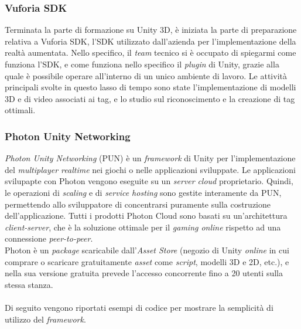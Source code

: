 \subsubsection{Vuforia SDK}
Terminata la parte di formazione su Unity 3D, \`e iniziata la parte di preparazione relativa a Vuforia SDK, l'SDK utilizzato dall'azienda per l'implementazione della realt\`a aumentata. Nello specifico, il \textit{team} tecnico si \`e occupato di spiegarmi come funziona l'SDK, e come funziona nello specifico il \textit{plugin} di Unity, grazie alla quale è possibile operare all’interno di un unico ambiente di lavoro. Le attivit\`a principali svolte in questo lasso di tempo sono state l'implementazione di modelli 3D e di video associati ai tag, e lo studio sul riconoscimento e la creazione di tag ottimali.

\subsubsection{Photon Unity Networking}
\textit{Photon Unity Networking} (PUN) \`e un \textit{framework} di Unity per l'implementazione del \textit{multiplayer realtime} nei giochi o nelle applicazioni sviluppate. Le applicazioni svilupapte con Photon vengono eseguite su un \textit{server} \textit{cloud} proprietario. Quindi, le operazioni di \textit{scaling} e di \textit{service hosting} sono gestite interamente da PUN, permettendo allo sviluppatore di concentrarsi puramente sulla costruzione dell'applicazione. Tutti i prodotti Photon Cloud sono basati su un'architettura \textit{client-server\gloss}, che \`e la soluzione ottimale per il \textit{gaming online} rispetto ad una connessione \textit{peer-to-peer}.\\
Photon \`e un \textit{package} scaricabile dall'\textit{Asset Store} (negozio di Unity \textit{online} in cui comprare o scaricare gratuitamente \textit{asset\gloss} come \textit{script}, modelli 3D e 2D, etc.), e nella sua versione gratuita prevede l'accesso concorrente fino a 20 utenti sulla stessa stanza. \\\\
Di seguito vengono riportati esempi di codice per mostrare la semplicit\`a di utilizzo del \textit{framework}.\\
